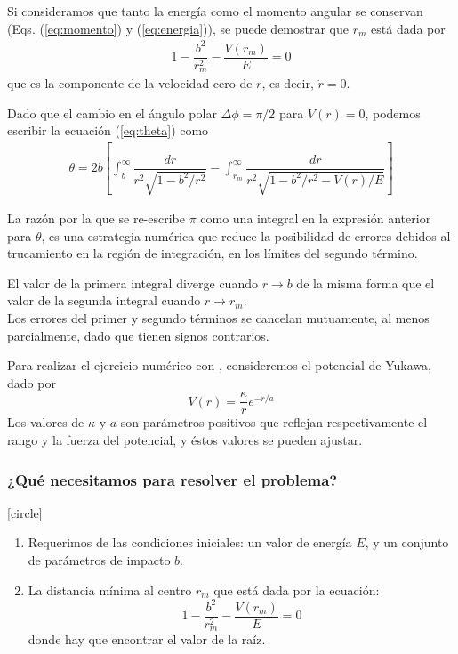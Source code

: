 \begin{frame}
Si consideramos que tanto la energía como el momento angular se conservan (Eqs. (\ref{eq:momento}) y (\ref{eq:energia})), se puede demostrar que $r_{m}$ está dada por
\begin{eqnarray}
1 - \dfrac{b^{2}}{r_{m}^{2}} - \dfrac{V(r_{m})}{E} = 0
\label{eq:raiz_rm} 
\end{eqnarray}
que es la componente de la velocidad cero de $r$, es decir, $\dot{r}=0$.
\end{frame}
\begin{frame}
Dado que el cambio en el ángulo polar $\Delta \phi = \pi/2$ para $V(r)=0$, podemos escribir la ecuación (\ref{eq:theta}) como
\fontsize{12}{12}\selectfont
\begin{eqnarray}
\theta = 2b \left[ \int_{b}^{\infty} \dfrac{dr}{r^{2} \sqrt{1-b^{2}/r^{2}}} - \int_{r_{m}}^{\infty} \dfrac{dr}{r^{2} \sqrt{1-b^{2}/r^{2} - V(r)/E}} \right]
\label{eq:integrales_theta} 
\end{eqnarray} 
\end{frame}
\begin{frame}
La razón por la que se re-escribe $\pi$ como una integral en la expresión anterior para $\theta$, es una estrategia numérica que reduce la posibilidad de errores debidos al trucamiento en la región de integración, en los límites del segundo término.
\end{frame}
\begin{frame}
El valor de la primera integral diverge cuando $r \rightarrow b$ de la misma forma que el valor de la segunda integral cuando $r \rightarrow r_{m}$.
\\
\bigskip
\pause
Los errores del primer y segundo términos se cancelan mutuamente, al menos parcialmente, dado que tienen signos contrarios.
\end{frame}
\begin{frame}
Para realizar el ejercicio numérico con \python, consideremos el potencial de Yukawa, dado por
\[ V(r) = \dfrac{\kappa}{r} e^{-r/a}\]
Los valores de $\kappa$ y $a$ son parámetros positivos que reflejan respectivamente el rango y la fuerza del potencial, y éstos valores se pueden ajustar.
\end{frame}
\begin{frame}
\frametitle{¿Qué necesitamos para resolver el problema?}
[circle]
\begin{enumerate}[<+->]
\item Requerimos de las condiciones iniciales: un valor de energía $E$, y un conjunto de parámetros de impacto $b$.
\item La distancia mínima al centro $r_{m}$ que está dada por la ecuación:
\[ 1  - \dfrac{b^{2}}{r_{m}^{2}} - \dfrac{V(r_{m})}{E} = 0\]
donde hay que encontrar el valor de la raíz.
\seti
\end{enumerate}
\end{frame}

